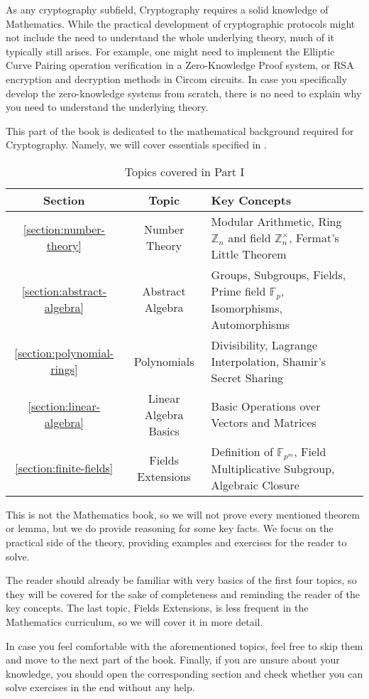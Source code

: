 \documentclass[../../lecture-notes-148x210.tex]{subfiles}
\begin{document}
As any cryptography subfield, Cryptography requires a solid knowledge of
Mathematics. While the practical development of cryptographic protocols might
not include the need to understand the whole underlying theory, much of it
typically still arises. For example, one might need to implement the Elliptic
Curve Pairing operation verification in a Zero-Knowledge Proof system, or RSA
encryption and decryption methods in Circom circuits. In case you specifically
develop the zero-knowledge systems from scratch, there is no need to explain why
you need to understand the underlying theory.

This part of the book is dedicated to the mathematical background required for
Cryptography. Namely, we will cover essentials specified in .

\begin{table}[H]
    \centering
    \begin{tabularx}{\textwidth}{|c|c|X|}
        \hline
        \rowcolor{blue!30}\textbf{Section} & \textbf{Topic} & \textbf{Key Concepts} \\
        \hline
        \rowcolor{blue!10}\ref{section:number-theory} & Number Theory & Modular
        Arithmetic, Ring $\mathbb{Z}_n$ and field $\mathbb{Z}_n^{\times}$,
        Fermat's Little Theorem \\
        \hline
        \rowcolor{blue!20}\ref{section:abstract-algebra} & Abstract Algebra &
        Groups, Subgroups, Fields, Prime field $\mathbb{F}_p$, Isomorphisms,
        Automorphisms \\
        \hline
        \rowcolor{blue!10}\ref{section:polynomial-rings} & Polynomials & Divisibility, Lagrange Interpolation, Shamir's Secret Sharing \\
        \hline
        \rowcolor{blue!20}\ref{section:linear-algebra} & Linear Algebra Basics & Basic Operations over Vectors and Matrices \\
        \hline
        \rowcolor{blue!10}\ref{section:finite-fields} & Fields Extensions & Definition of $\mathbb{F}_{p^m}$, Field Multiplicative Subgroup, Algebraic Closure \\
        \hline
    \end{tabularx}
    \caption{Topics covered in Part I}
    \label{tab:essentialls}
\end{table}

This is not the Mathematics book, so we will not prove every mentioned theorem
or lemma, but we do provide reasoning for some key facts. We
focus on the practical side of the theory, providing examples and exercises for
the reader to solve.

The reader should already be familiar with very basics of the first four topics,
so they will be covered for the sake of completeness and reminding the reader of
the key concepts. The last topic, Fields Extensions, is less frequent in 
the Mathematics curriculum, so we will cover it in more detail.

In case you feel comfortable with the aforementioned topics, feel free to skip 
them and move to the next part of the book. Finally, if you are unsure about 
your knowledge, you should open the corresponding section and check whether 
you can solve exercises in the end without any help.
\end{document}

